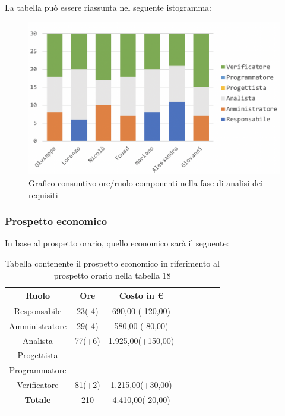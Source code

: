 			La tabella può essere riassunta nel seguente istogramma:
			
			\begin{figure}[H]
				\centering
				\includegraphics[width=0.8\linewidth]{images/consuntivo/analisiCons1.png}
				\caption{Grafico consuntivo ore/ruolo componenti nella fase di analisi dei requisiti}
				\label{fig:consuntivo grafico suddivione ruoli fase analisi dei requisiti}
			\end{figure}
			
		\subsubsection{Prospetto economico}
			In base al prospetto orario, quello economico sarà il seguente: 
			
			\begin{longtable}{|c|c|c|c|c|c|c|c}
				\hline
				\rowcolor{lighter-grayer}
				\textbf{Ruolo} & \textbf{Ore} & \textbf{Costo in €} \\
				\hline
				\endfirsthead
				
				\hline
				Responsabile & 23(-4) & 690,00 (-120,00)\\
				\hline
				\hline
				Amministratore & 29(-4) & 580,00 (-80,00)\\
				\hline
				\hline
				Analista & 77(+6) & 1.925,00(+150,00)\\
				\hline
				\hline
				Progettista & - & -\\
				\hline
				\hline
				Programmatore & - & -\\
				\hline
				\hline
				Verificatore & 81(+2) & 1.215,00(+30,00)\\
				\hline
				\textbf{Totale} & 210 & 4.410,00(-20,00)\\
				\hline
				\caption{Tabella contenente il prospetto economico in riferimento al prospetto orario nella tabella 18}
			\end{longtable}
			\pagebreak
			
